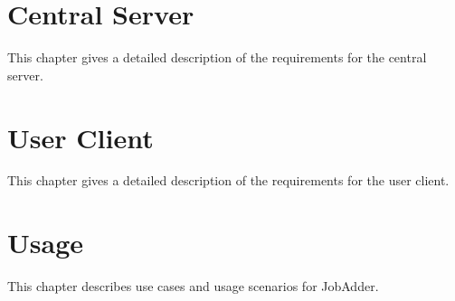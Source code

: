 \chapter{Central Server}
This chapter gives a detailed description of the requirements for the central server.




\chapter{User Client}
This chapter gives a detailed description of the requirements for the user client.






\chapter{Usage}
This chapter describes use cases and usage scenarios for JobAdder.


